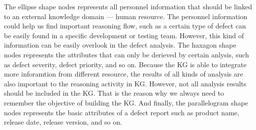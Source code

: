 \documentclass[12pt] {article}
\begin{document}
The ellipse shape nodes represents all personnel information that should be linked to an external knowledge domain --- human resource.
The personnel information could help us find important reasoning flow, such as a certain type of defect can be easily found in a specific development or testing team.
However, this kind of information can be easily overlook in the defect analysis.
The haxagon shape nodes represents the attributes that can only be derieved by certain anlysis, such as defect severity, defect priority, and so on.
Because the KG is able to integrate more inforamtion from different resource, the results of all kinds of analysis are also important to the reasoning activity in KG.
However, not all analysis results should be included in the KG.
That is the reason why we always need to remember the objective of building the KG.
And finally, the parallelogram shape nodes represents the basic attributes of a defect report such as product name, release date, release version, and so on.
\end{document}

